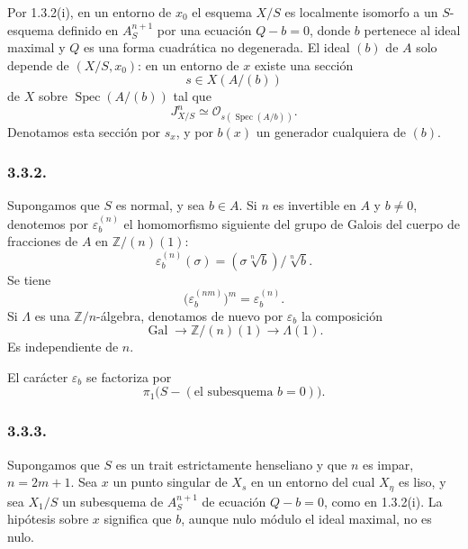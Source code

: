 Por 1.3.2(i), en un entorno de $x_0$ el esquema $X/S$ es localmente
isomorfo a un $S$-esquema definido en $A^{n+1}_S$ por una
ecuación $Q-b=0$, donde $b$ pertenece al ideal maximal y $Q$ es una
forma cuadrática no degenerada. El ideal $(b)$ de $A$ solo depende de
$(X/S,x_0)$: en un entorno de $x$ existe una sección
\[
s\in X(A/(b))
\]
de $X$ sobre $\operatorname{Spec}(A/(b))$ tal que
\[
J^n_{X/S}\simeq
\mathcal O_{s(\operatorname{Spec}(A/b))}.
\]
Denotamos esta sección por $s_x$, y por $b(x)$ un generador cualquiera
de $(b)$.

\pageoriginale

\subsubsection*{3.3.2.}
Supongamos que $S$ es normal, y sea $b\in A$. Si $n$ es invertible en
$A$ y $b\ne0$, denotemos por $\varepsilon_b^{(n)}$ el homomorfismo
siguiente del grupo de Galois del cuerpo de fracciones de $A$ en
$\mathbb Z/(n)(1)$:
\[
\varepsilon_b^{(n)}(\sigma)
= (\sigma\sqrt[n]{b})/\sqrt[n]{b}.
\]
Se tiene
\[
\bigl(\varepsilon_b^{(nm)}\bigr)^m=\varepsilon_b^{(n)}.
\]
Si $\Lambda$ es una $\mathbb Z/n$-álgebra, denotamos de nuevo por
$\varepsilon_b$ la composición
\[
\operatorname{Gal}\longrightarrow\mathbb Z/(n)(1)
\longrightarrow\Lambda(1).
\]
Es independiente de $n$.

El carácter $\varepsilon_b$ se factoriza por
\[
\pi_1\bigl(S-(\text{el subesquema }b=0)\bigr).
\]

\subsubsection*{3.3.3.}
Supongamos que $S$ es un trait estrictamente henseliano y que $n$ es
impar, $n=2m+1$. Sea $x$ un punto singular de $X_s$ en un entorno del
cual $X_\eta$ es liso, y sea $X_1/S$ un subesquema de
$A^{n+1}_S$ de ecuación $Q-b=0$, como en 1.3.2(i). La
hipótesis sobre $x$ significa que $b$, aunque nulo módulo el ideal
maximal, no es nulo.

